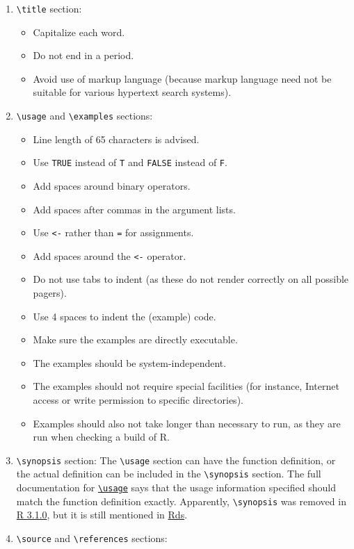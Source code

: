 \documentclass[
]{book}
\providecommand{\tightlist}{%
  \setlength{\itemsep}{0pt}\setlength{\parskip}{0pt}}
\begin{document}
\begin{enumerate}
\def\labelenumi{\arabic{enumi}.}
\item
  \texttt{\textbackslash{}title} section:

  \begin{itemize}
  \tightlist
  \item
    Capitalize each word.
  \item
    Do not end in a period.
  \item
    Avoid use of markup language (because markup language need not be suitable for various hypertext search systems).
  \end{itemize}
\item
  \texttt{\textbackslash{}usage} and \texttt{\textbackslash{}examples} sections:

  \begin{itemize}
  \tightlist
  \item
    Line length of 65 characters is advised.
  \item
    Use \texttt{TRUE} instead of \texttt{T} and \texttt{FALSE} instead of \texttt{F}.
  \item
    Add spaces around binary operators.
  \item
    Add spaces after commas in the argument lists.
  \item
    Use \texttt{\textless{}-} rather than \texttt{=} for assignments.
  \item
    Add spaces around the \texttt{\textless{}-} operator.
  \item
    Do not use tabs to indent (as these do not render correctly on all possible pagers).
  \item
    Use 4 spaces to indent the (example) code.
  \item
    Make sure the examples are directly executable.
  \item
    The examples should be system-independent.
  \item
    The examples should not require special facilities (for instance, Internet access or write permission to specific directories).
  \item
    Examples should also not take longer than necessary to run, as they are run when checking a build of R.
  \end{itemize}
\item
  \texttt{\textbackslash{}synopsis} section: The \texttt{\textbackslash{}usage} section can have the function definition, or the actual definition can be included in the \texttt{\textbackslash{}synopsis} section. The full documentation for \href{https://cran.r-project.org/doc/manuals/r-release/R-exts.html\#Documenting-functions}{\texttt{\textbackslash{}usage}} says that the usage information specified should match the function definition exactly. Apparently, \texttt{\textbackslash{}synopsis} was removed in \href{https://github.com/r-devel/r-svn/blob/0d65935f30dcaccfeee1dd61991bf4b1444873bc/src/library/tools/R/RdConv2.R\#L918-L919}{R 3.1.0}, but it is still mentioned in \href{https://developer.r-project.org/Rds.html}{Rds}.
\item
  \texttt{\textbackslash{}source} and \texttt{\textbackslash{}references} sections:


\end{enumerate}
\end{document}

